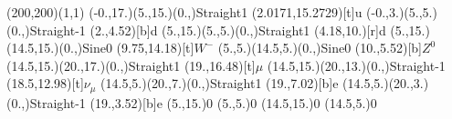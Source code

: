 \documentclass[12pt]{article}
\begin{document}
 
 \thispagestyle{empty}
	
 \begin{feynartspicture}(200,200)(1,1) 
 \FADiagram{} 
\FAProp(-0.,17.)(5.,15.)(0.,){Straight}{1}
\FALabel(2.0171,15.2729)[t]{u}
\FAProp(-0.,3.)(5.,5.)(0.,){Straight}{-1}
\FALabel(2.,4.52)[b]{d}
\FAProp(5.,15.)(5.,5.)(0.,){Straight}{1}
\FALabel(4.18,10.)[r]{d}
\FAProp(5.,15.)(14.5,15.)(0.,){Sine}{0}
\FALabel(9.75,14.18)[t]{$W^-$}
\FAProp(5.,5.)(14.5,5.)(0.,){Sine}{0}
\FALabel(10.,5.52)[b]{$Z^0$}
\FAProp(14.5,15.)(20.,17.)(0.,){Straight}{1}
\FALabel(19.,16.48)[t]{$\mu$}
\FAProp(14.5,15.)(20.,13.)(0.,){Straight}{-1}
\FALabel(18.5,12.98)[t]{$\nu_{\mu}$}
\FAProp(14.5,5.)(20.,7.)(0.,){Straight}{1}
\FALabel(19.,7.02)[b]{e}
\FAProp(14.5,5.)(20.,3.)(0.,){Straight}{-1}
\FALabel(19.,3.52)[b]{e}
\FAVert(5.,15.){0}
\FAVert(5.,5.){0}
\FAVert(14.5,15.){0}
\FAVert(14.5,5.){0}
 
	
 
 \end{feynartspicture} 
 
\end{document}
